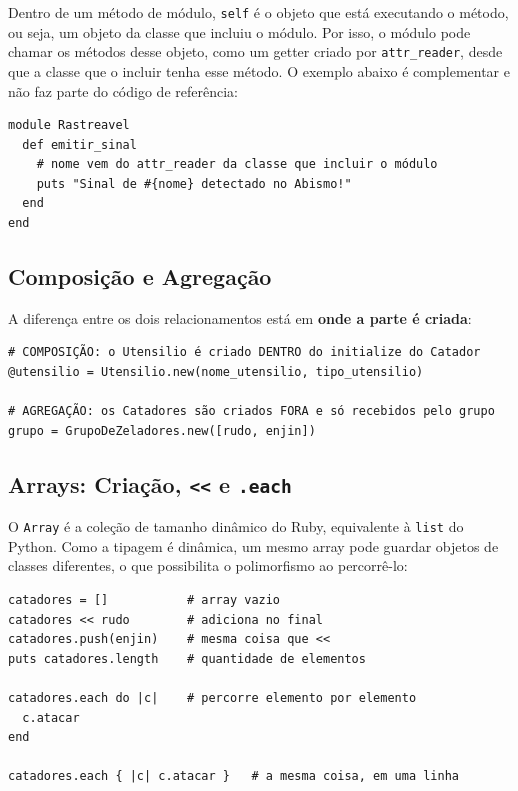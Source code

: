 Dentro de um método de módulo, \texttt{self} é o objeto que está executando o método, ou seja,
um objeto da classe que incluiu o módulo. Por isso, o módulo pode chamar os métodos desse objeto,
como um getter criado por \texttt{attr\_reader}, desde que a classe que o incluir tenha esse
método. O exemplo abaixo é complementar e não faz parte do código de referência:

\begin{lstlisting}[style=ruby]
module Rastreavel
  def emitir_sinal
    # nome vem do attr_reader da classe que incluir o módulo
    puts "Sinal de #{nome} detectado no Abismo!"
  end
end
\end{lstlisting}

\subsection{Composição e Agregação}

A diferença entre os dois relacionamentos está em \textbf{onde a parte é criada}:

\begin{lstlisting}[style=ruby]
# COMPOSIÇÃO: o Utensilio é criado DENTRO do initialize do Catador
@utensilio = Utensilio.new(nome_utensilio, tipo_utensilio)

# AGREGAÇÃO: os Catadores são criados FORA e só recebidos pelo grupo
grupo = GrupoDeZeladores.new([rudo, enjin])
\end{lstlisting}

\subsection{Arrays: Criação, \texttt{<{}<} e \texttt{.each}}

O \texttt{Array} é a coleção de tamanho dinâmico do Ruby, equivalente à \texttt{list} do Python.
Como a tipagem é dinâmica, um mesmo array pode guardar objetos de classes diferentes, o que
possibilita o polimorfismo ao percorrê-lo:

\begin{lstlisting}[style=ruby]
catadores = []           # array vazio
catadores << rudo        # adiciona no final
catadores.push(enjin)    # mesma coisa que <<
puts catadores.length    # quantidade de elementos

catadores.each do |c|    # percorre elemento por elemento
  c.atacar
end

catadores.each { |c| c.atacar }   # a mesma coisa, em uma linha
\end{lstlisting}

